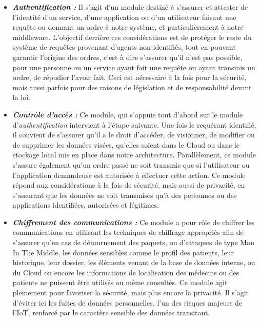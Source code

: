 \begin{itemize}
\item \textbf{\textit{Authentification :}} Il s'agit d'un module destiné à s'assurer et attester de l'identité d'un service, d'une application ou d'un utilisateur faisant une requête ou donnant un ordre à notre système, et particulièrement à notre middleware. L'objectif derrière ces considérations est de protéger le reste du système de requêtes provenant d'agents non-identifiés, tout en pouvant garantir l'origine des ordres, c'est à dire s'assurer qu'il n'est pas possible, pour une personne ou un service ayant fait une requête ou ayant transmis un ordre, de répudier l'avoir fait. Ceci est nécessaire à la fois pour la sécurité, mais aussi parfois pour des raisons de législation et de responsabilité devant la loi.
\item \textbf{\textit{Contrôle d'accès :}} Ce module, qui s'appuie tout d'abord sur le module d'\textit{authentification} intervient à l'étape suivante. Une fois le requérant identifié, il convient de s'assurer qu'il a le droit d'accéder, de visionner, de modifier ou de supprimer les données visées, qu'elles soient dans le Cloud ou dans le stockage local mis en place dans notre architecture. Parallèlement, ce module s'assure également qu'un ordre passé ne soit transmis que si l'utilisateur ou l'application demandeuse est autorisée à effectuer cette action. Ce module répond aux considérations à la fois de sécurité, mais aussi de privacité, en s'assurant que les données ne soit transmises qu'à des personnes ou des applications identifiées, autorisées et légitimes.
\item \textbf{\textit{Chiffrement des communications :}} Ce module a pour rôle de chiffrer les communications en utilisant les techniques de chiffrage appropriés afin de s'assurer qu'en cas de détournement des paquets, ou d'attaques de type Man In The Middle, les données sensibles comme le profil des patients, leur historique, leur dossier, les éléments venant de la base de données interne, ou du Cloud ou encore les informations de localisation des médecins ou des patients ne puissent être utilisés ou même consultés. Ce module agit pleinement pour favoriser la sécurité, mais plus encore la privacité. Il s'agit d'éviter ici les fuites de données personnelles, l'un des risques majeurs de l'IoT, renforcé par le caractère sensible des données transitant.

\end{itemize}

